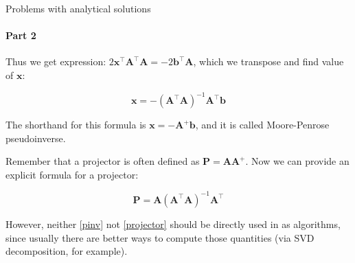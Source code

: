\documentclass{beamer}
\begin{document}
\begin{frame}{Problems with analytical solutions}
\framesubtitle{Part 2}
\begin{flushleft}

Thus we get expression: $2\mathbf{x}^\top\mathbf{A}^\top\mathbf{A} = -2\mathbf{b}^\top\mathbf{A}$, which we transpose and find value of $\mathbf{x}$:

\begin{equation} \label{pinv}
\mathbf{x} = -(\mathbf{A}^\top\mathbf{A})^{-1}\mathbf{A}^\top\mathbf{b}
\end{equation}

The shorthand for this formula is $\mathbf{x} = -\mathbf{A}^+\mathbf{b}$, and it is called Moore-Penrose pseudoinverse.

\bigskip

Remember that a projector is often defined as $\mathbf{P} = \mathbf{A}\mathbf{A}^+$. Now we can provide an explicit formula for a projector:

\begin{equation} \label{projector}
\mathbf{P} = \mathbf{A}(\mathbf{A}^\top\mathbf{A})^{-1}\mathbf{A}^\top
\end{equation}

However, neither \eqref{pinv} not \eqref{projector} should be directly used in as algorithms, since usually there are better ways to compute those quantities (via SVD decomposition, for example).

\end{flushleft}
\end{frame}
\end{document}
